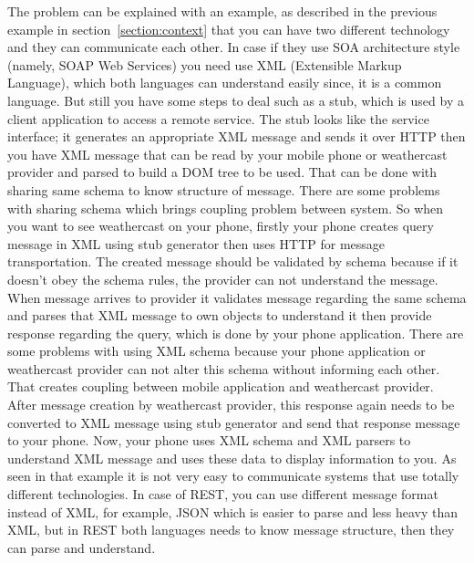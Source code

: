 The problem can be explained with an example, as described in the previous example in section \ref{section:context} that you can have two different technology and they can communicate each other. In case if they use SOA architecture style (namely, SOAP Web Services) you need use XML (Extensible Markup Language), which both languages can understand easily since, it is a common language. But still you have some steps to deal such as a stub, which is used by a client application to access a remote service. The stub looks like the service interface\citep{thesis:introduction3}; it generates an appropriate XML message and sends it over HTTP then you have XML message that can be read by your mobile phone or weathercast provider and parsed to build a DOM tree to be used. That can be done with sharing same schema to know structure of message. There are some problems with sharing schema which brings coupling problem between system. So when you want to see weathercast on your phone, firstly your phone creates query message in XML using stub generator then uses HTTP for message transportation. The created message should be validated by schema because if it doesn't obey the schema rules, the provider can not understand the message. When message arrives to provider it validates message regarding the same schema and parses that XML message to own objects to understand it then provide response regarding the query, which is done by your phone application. There are some problems with using XML schema because your phone application or weathercast provider can not alter this schema without informing each other. That creates coupling between mobile application and weathercast provider. After message creation by weathercast provider, this response again needs to be converted to XML message using stub generator and send that response message to your phone. Now, your phone uses XML schema and XML parsers to understand XML message and uses these data to display information to you. As seen in that example it is not very easy to communicate systems that use totally different technologies. In case of REST, you can use different message format instead of XML, for example, JSON which is easier to parse and less heavy than XML, but in REST both languages needs to know message structure, then they can parse and understand.

